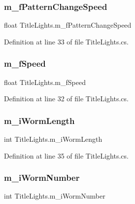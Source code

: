 \subsubsection{\texorpdfstring{m\+\_\+f\+Pattern\+Change\+Speed}{m\_fPatternChangeSpeed}}
{\footnotesize\ttfamily float Title\+Lights.\+m\+\_\+f\+Pattern\+Change\+Speed}



Definition at line 33 of file Title\+Lights.\+cs.

\mbox{\label{class_title_lights_ae0b4ae86320d22122ecda0fadc6e1370}} 
\subsubsection{\texorpdfstring{m\+\_\+f\+Speed}{m\_fSpeed}}
{\footnotesize\ttfamily float Title\+Lights.\+m\+\_\+f\+Speed}



Definition at line 32 of file Title\+Lights.\+cs.

\mbox{\label{class_title_lights_af991609535f2508c7f6f8f9c4db5266e}} 
\subsubsection{\texorpdfstring{m\+\_\+i\+Worm\+Length}{m\_iWormLength}}
{\footnotesize\ttfamily int Title\+Lights.\+m\+\_\+i\+Worm\+Length}



Definition at line 35 of file Title\+Lights.\+cs.

\mbox{\label{class_title_lights_ad4b72c134541a01977825b07bb4e55f7}} 
\subsubsection{\texorpdfstring{m\+\_\+i\+Worm\+Number}{m\_iWormNumber}}
{\footnotesize\ttfamily int Title\+Lights.\+m\+\_\+i\+Worm\+Number}



